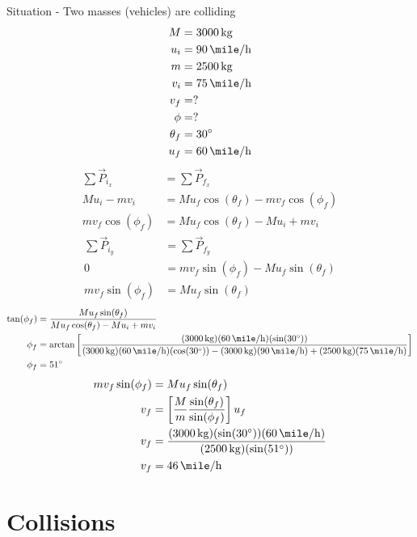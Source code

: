 \documentclass{article}
\begin{document}
Situation - Two masses (vehicles) are colliding
\begin{align*}
	M & = \SI{3000}{\kilogram} \\
	u_i & = \SI{90}{\mile \per \hour} \\
	m & = \SI{2500}{\kilogram} \\
	v_i & = \SI{75}{\mile \per \hour} \\
	v_f & = ? \\
	\phi & = ? \\
	\theta_f & = \SI{30}{\degree} \\
	u_f & = \SI{60}{\mile \per \hour}
\end{align*}
\begin{align*}
	\sum \vec{P}_{i_x} & = \sum \vec{P}_{f_x} \\
	Mu_i - mv_i & = Mu_f\cos(\theta_f) - mv_f\cos(\phi_f) \\
	mv_f\cos(\phi_f) & = Mu_f\cos(\theta_f) - Mu_i + mv_i
\end{align*}
\begin{align*}
	\sum \vec{P}_{i_y} & = \sum \vec{P}_{f_y} \\
	0 & = mv_f\sin(\phi_f) - Mu_f\sin(\theta_f) \\
	mv_f\sin(\phi_f) & = Mu_f\sin(\theta_f)
\end{align*}
\begin{align*}
	\tan(\phi_f) & = \frac{Mu_f\sin(\theta_f)}{Mu_f\cos(\theta_f) - Mu_i + mv_i} \\
	\phi_f & = \arctan \left[ \frac{(\SI{3000}{\kilogram})(\SI{60}{\mile \per \hour})(\sin(\SI{30}{\degree}))}{(\SI{3000}{\kilogram})(\SI{60}{\mile \per \hour})(\cos(\SI{30}{\degree})) - (\SI{3000}{\kilogram})(\SI{90}{\mile \per \hour}) + (\SI{2500}{\kilogram})(\SI{75}{\mile \per \hour})} \right] \\
	\phi_f & = \SI{51}{\degree}
\end{align*}
\begin{align*}
	mv_f\sin(\phi_f) & = Mu_f\sin(\theta_f) \\
	v_f & = \left[ \frac{M}{m} \frac{\sin(\theta_f)}{\sin(\phi_f)} \right] u_f \\
	v_f & = \frac{(\SI{3000}{\kilogram})(\sin(\SI{30}{\degree}))(\SI{60}{\mile \per \hour})}{(\SI{2500}{\kilogram})(\sin(\SI{51}{\degree}))} \\
	v_f & = \SI{46}{\mile \per \hour}
\end{align*}

\section{Collisions}
\end{document}
